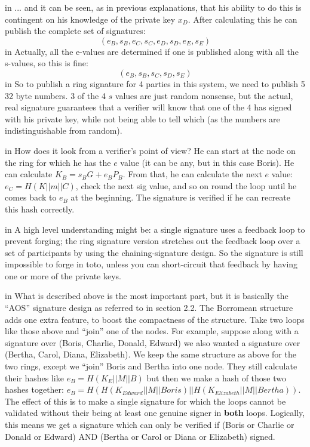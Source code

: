 \documentclass[10pt,a4paper]{article}
\begin{document}
 in \noindent ... and it can be seen, as in previous explanations, that his ability to do this is contingent on his knowledge of the private key $x_D$. After calculating this he can publish the complete set of signatures:
\[ (e_B, s_B, e_C, s_C, e_D, s_D, e_E, s_E) \]
 in \noindent Actually, all the e-values are determined if one is published along with all the s-values, so this is fine:
\[(e_B, s_B, s_C, s_D, s_E)\]
 in \noindent So to publish a ring signature for 4 parties in this system, we need to publish 5 32 byte numbers. 3 of the 4 $s$ values are just random nonsense, but the actual, real signature guarantees that a verifier will know that one of the 4 has signed with his private key, while not being able to tell which (as the numbers are indistinguishable from random).

 in \noindent How does it look from a verifier's point of view? He can start at the node on the ring for which he has the $e$ value (it can be any, but in this case Boris). He can calculate $K_B = s_{B}G + e_{B}P_B$. From that, he can calculate the next $e$ value: $e_C = H(K || m || C)$, check the next sig value, and so on round the loop until he comes back to $e_B$ at the beginning. The signature is verified if he can recreate this hash correctly.

 in \noindent A high level understanding might be: a single signature uses a feedback loop to prevent forging; the ring signature version stretches out the feedback loop over a set of participants by using the chaining-signature design. So the signature is still impossible to forge in toto, unless you can short-circuit that feedback by having one or more of the private keys.

 in \noindent What is described above is the most important part, but it is basically the ``AOS'' signature design as referred to in \cite{borromean} section 2.2. The Borromean structure adds one extra feature, to boost the compactness of the structure. Take two loops like those above and ``join'' one of the nodes. For example, suppose along with a signature over (Boris, Charlie, Donald, Edward) we also wanted a signature over (Bertha, Carol, Diana, Elizabeth). We keep the same structure as above for the two rings, except we ``join'' Boris and Bertha into one node. They still calculate their hashes like $e_B = H(K_E || M || B)$ but then we make a hash of those two hashes together: $e_B = H(H(K_{Edward} || M || Boris) || H(K_{Elizabeth} || M || Bertha))$. The effect of this is to make a single signature for which the loops cannot be validated without their being at least one genuine signer in \textbf{both} loops. Logically, this means we get a signature which can only be verified if (Boris or Charlie or Donald or Edward) AND (Bertha or Carol or Diana or Elizabeth) signed.
\end{document}
